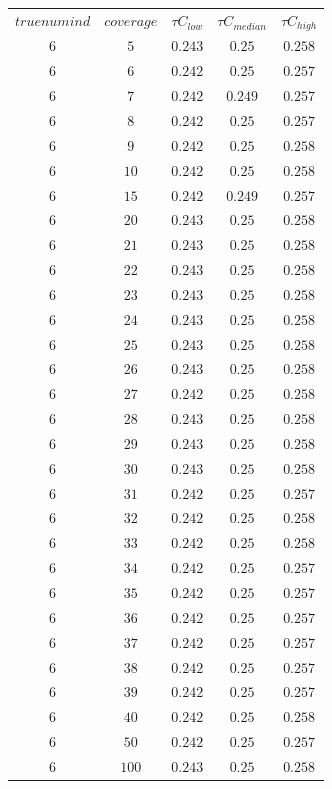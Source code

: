 \begin{table}[H]
\begin{tabular}{ccccc}
$truenumind$ & $coverage$ & ${\tau}C_{low}$ & ${\tau}C_{median}$ & ${\tau}C_{high}$\\
$6$ & $5$ & $0.243$ & $0.25$ & $0.258$\\
$6$ & $6$ & $0.242$ & $0.25$ & $0.257$\\
$6$ & $7$ & $0.242$ & $0.249$ & $0.257$\\
$6$ & $8$ & $0.242$ & $0.25$ & $0.257$\\
$6$ & $9$ & $0.242$ & $0.25$ & $0.258$\\
$6$ & $10$ & $0.242$ & $0.25$ & $0.258$\\
$6$ & $15$ & $0.242$ & $0.249$ & $0.257$\\
$6$ & $20$ & $0.243$ & $0.25$ & $0.258$\\
$6$ & $21$ & $0.243$ & $0.25$ & $0.258$\\
$6$ & $22$ & $0.243$ & $0.25$ & $0.258$\\
$6$ & $23$ & $0.243$ & $0.25$ & $0.258$\\
$6$ & $24$ & $0.243$ & $0.25$ & $0.258$\\
$6$ & $25$ & $0.243$ & $0.25$ & $0.258$\\
$6$ & $26$ & $0.243$ & $0.25$ & $0.258$\\
$6$ & $27$ & $0.242$ & $0.25$ & $0.258$\\
$6$ & $28$ & $0.243$ & $0.25$ & $0.258$\\
$6$ & $29$ & $0.243$ & $0.25$ & $0.258$\\
$6$ & $30$ & $0.243$ & $0.25$ & $0.258$\\
$6$ & $31$ & $0.242$ & $0.25$ & $0.257$\\
$6$ & $32$ & $0.242$ & $0.25$ & $0.258$\\
$6$ & $33$ & $0.242$ & $0.25$ & $0.258$\\
$6$ & $34$ & $0.242$ & $0.25$ & $0.257$\\
$6$ & $35$ & $0.242$ & $0.25$ & $0.257$\\
$6$ & $36$ & $0.242$ & $0.25$ & $0.257$\\
$6$ & $37$ & $0.242$ & $0.25$ & $0.257$\\
$6$ & $38$ & $0.242$ & $0.25$ & $0.257$\\
$6$ & $39$ & $0.242$ & $0.25$ & $0.257$\\
$6$ & $40$ & $0.242$ & $0.25$ & $0.258$\\
$6$ & $50$ & $0.242$ & $0.25$ & $0.257$\\
$6$ & $100$ & $0.243$ & $0.25$ & $0.258$\\
\end{tabular}
\end{table}
 